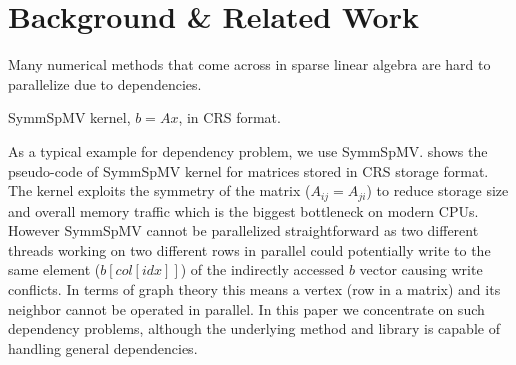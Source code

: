 \section{Background \& Related Work} \label{sec:background}
Many numerical methods that come across in sparse linear algebra are hard to 
parallelize due to dependencies. 

\begin{algorithm}[tb]
	\caption{\label{alg:symmSpMV} \acrshort{SymmSpMV} kernel,  $b=Ax$, in \acrshort{CRS} format.}
	\begin{algorithmic}[1]
			\EndFor
		\EndFor
	\end{algorithmic}
\end{algorithm}

 
As a typical example for \DTWO dependency problem, we use \acrfull{SymmSpMV}. 
 shows the pseudo-code of \acrshort{SymmSpMV} kernel 
for matrices stored in \acrfull{CRS} \cite{CRS} storage format. The kernel exploits the symmetry
of the matrix ($A_{ij} = A_{ji}$) to reduce storage size and overall 
memory traffic which is the biggest bottleneck on modern CPUs. 
However \acrshort{SymmSpMV} cannot be parallelized straightforward as two 
different threads working on two different rows in parallel could potentially 
write to the same element ($b[col[idx]]$) of the indirectly accessed $b$ vector
causing write conflicts.
In terms of graph theory this means a vertex (row in a matrix) and 
its \DTWO neighbor \cite{dist_k_def} cannot be operated in parallel.
In this paper we concentrate on such \DTWO dependency problems, although 
the underlying method and library is capable of handling 
general \DK dependencies.


